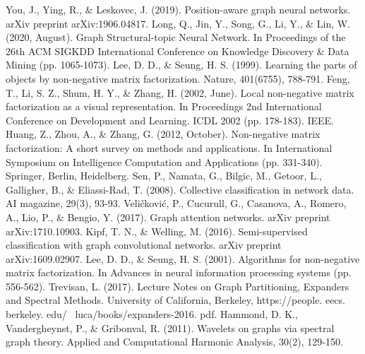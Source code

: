 \documentclass[english,onecolumn]{IEEEtran}
\begin{document}
\begin{thebibliography}{00}
	 You, J., Ying, R., \& Leskovec, J. (2019). Position-aware graph neural networks. arXiv preprint arXiv:1906.04817.
	 Long, Q., Jin, Y., Song, G., Li, Y., \& Lin, W. (2020, August). Graph Structural-topic Neural Network. In Proceedings of the 26th ACM SIGKDD International Conference on Knowledge Discovery \& Data Mining (pp. 1065-1073).
	 Lee, D. D., \& Seung, H. S. (1999). Learning the parts of objects by non-negative matrix factorization. Nature, 401(6755), 788-791.
	 Feng, T., Li, S. Z., Shum, H. Y., \& Zhang, H. (2002, June). Local non-negative matrix factorization as a visual representation. In Proceedings 2nd International Conference on Development and Learning. ICDL 2002 (pp. 178-183). IEEE.
	 Huang, Z., Zhou, A., \& Zhang, G. (2012, October). Non-negative matrix factorization: A short survey on methods and applications. In International Symposium on Intelligence Computation and Applications (pp. 331-340). Springer, Berlin, Heidelberg.
	 Sen, P., Namata, G., Bilgic, M., Getoor, L., Galligher, B., \& Eliassi-Rad, T. (2008). Collective classification in network data. AI magazine, 29(3), 93-93.
	 Veličković, P., Cucurull, G., Casanova, A., Romero, A., Lio, P., \& Bengio, Y. (2017). Graph attention networks. arXiv preprint arXiv:1710.10903.
	 Kipf, T. N., \& Welling, M. (2016). Semi-supervised classification with graph convolutional networks. arXiv preprint arXiv:1609.02907.
	 Lee, D. D., \& Seung, H. S. (2001). Algorithms for non-negative matrix factorization. In Advances in neural information processing systems (pp. 556-562).
	 Trevisan, L. (2017). Lecture Notes on Graph Partitioning, Expanders and Spectral Methods. University of California, Berkeley, https://people. eecs. berkeley. edu/~ luca/books/expanders-2016. pdf.
	 Hammond, D. K., Vandergheynst, P., \& Gribonval, R. (2011). Wavelets on graphs via spectral graph theory. Applied and Computational Harmonic Analysis, 30(2), 129-150.
\end{thebibliography}
	
\end{document}
